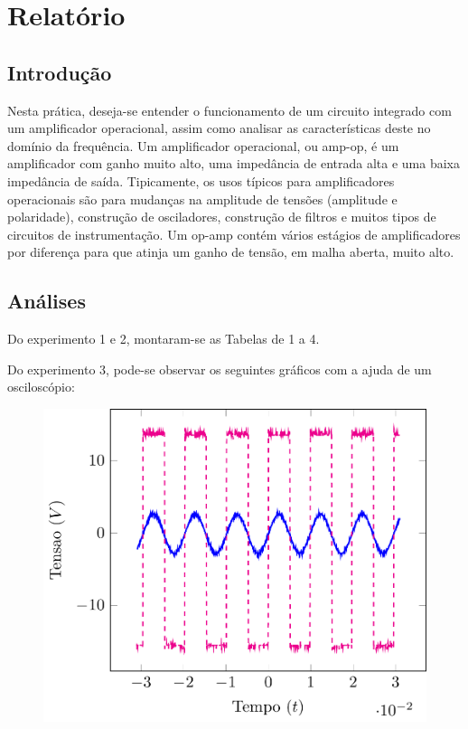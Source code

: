 \documentclass[12pt,a4paper]{article}
\begin{document}
\setcounter{figure}{4}
\setcounter{section}{3}
\setcounter{page}{5}
\section{Relatório}
\subsection{Introdução}

Nesta prática, deseja-se entender o funcionamento de um circuito integrado com um amplificador operacional, assim como analisar as características deste no domínio da frequência. Um amplificador operacional, ou amp-op, é um amplificador com ganho muito alto, uma impedância de entrada alta e uma baixa impedância de saída. Tipicamente, os usos típicos para amplificadores operacionais são para mudanças na amplitude de tensões (amplitude e polaridade), construção de osciladores, construção de filtros e muitos tipos de circuitos de instrumentação. Um op-amp contém vários estágios de amplificadores por diferença para que atinja um ganho de tensão, em malha aberta, muito alto. 

\subsection{Análises}
Do experimento 1 e 2, montaram-se as Tabelas de 1 a 4.

Do experimento 3, pode-se observar os seguintes gráficos com a ajuda de um osciloscópio:
\begin{figure}[htpb]
  \centering
  \includegraphics[width=0.8\linewidth]{./img/5V_100.pdf}
  \label{5V100}
\end{figure}
\end{document}
